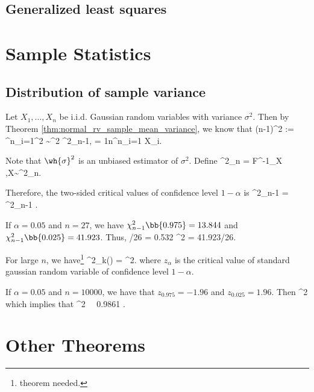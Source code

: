 \subsection{Generalized least squares}



\section{Sample Statistics}

\subsection{Distribution of sample variance}

Let $X_1,\dots,X_n$ be i.i.d. Gaussian random variables with variance $\sigma^2$. Then by Theorem \ref{thm:normal_rv_sample_mean_variance}, we know that
\be
(n-1)\wh{\sigma}^2 := \sum^n_{i=1}^2 \sim \sigma^2 \chi^2_{n-1},\qquad {} = \frac 1n\sum^n_{i=1} X_i.
\ee

Note that $\wh{\sigma}^2$ is an unbiased estimator of $\sigma^2$. Define
\be
\chi^2_n\bb{\alpha} = F^{-1}_X ,\quad X\sim \chi^2_n.
\ee

Therefore, the two-sided critical values of confidence level $1-\alpha$ is
\be
\chi^2_{n-1} =  \leq \chi^2_{n-1}  .
\ee

If $\alpha = 0.05$ and $n= 27$, we have $\chi^2_{n-1}\bb{0.975} = 13.844$ and $\chi^2_{n-1}\bb{0.025} = 41.923$. Thus,
/26 = 0.532 \leq \bb{\frac{\wh{\sigma}}{\sigma}}^2  = 41.923/26.
\ee

For large $n$, we have\footnote{theorem needed.}
\be
\chi^2_{k}(\alpha) =  ^2.
\ee
where $z_{\alpha}$ is the critical value of standard gaussian random variable of confidence level $1-\alpha$.

If $\alpha = 0.05$ and $n = 10000$, we have that $z_{0.975} = -1.96$ and $z_{0.025} = 1.96$. Then
\be
{} \leq \bb{\frac{\wh{\sigma}}{\sigma}}^2 \leq {}
\ee
which implies that
 \leq \bb{\frac{\wh{\sigma}}{\sigma}}^2  \ \ra\ 0.9861 \leq \frac{\wh{\sigma}}{\sigma} .
\ee

\section{Other Theorems}

